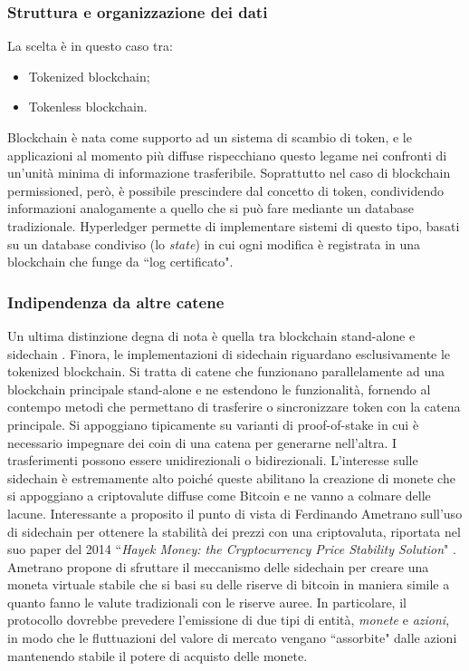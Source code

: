 		\subsubsection{Struttura e organizzazione dei dati}
			La scelta è in questo caso tra:
			\begin{itemize}
				\item Tokenized blockchain;
				\item Tokenless blockchain.
			\end{itemize}
			Blockchain è nata come supporto ad un sistema di scambio di token, e le applicazioni al momento più diffuse rispecchiano questo legame nei confronti di un'unità minima di informazione trasferibile. Soprattutto nel caso di blockchain permissioned, però, è possibile prescindere dal concetto di token, condividendo informazioni analogamente a quello che si può fare mediante un database tradizionale. Hyperledger permette di implementare sistemi di questo tipo, basati su un database condiviso (lo \emph{state}) in cui ogni modifica è registrata in una blockchain che funge da ``log certificato".
		
		\subsubsection{Indipendenza da altre catene}
			Un ultima distinzione degna di nota è quella tra blockchain stand-alone e sidechain \cite{sidechain}. Finora, le implementazioni di sidechain riguardano esclusivamente le tokenized blockchain. Si tratta di catene che funzionano parallelamente ad una blockchain principale stand-alone e ne estendono le funzionalità, fornendo al contempo metodi che permettano di trasferire o sincronizzare token con la catena principale. Si appoggiano tipicamente su varianti di proof-of-stake in cui è necessario impegnare dei coin di una catena per generarne nell'altra. I trasferimenti possono essere unidirezionali o bidirezionali. L'interesse sulle sidechain è estremamente alto poiché queste abilitano la creazione di monete che si appoggiano a criptovalute diffuse come Bitcoin e ne vanno a colmare delle lacune. Interessante a proposito il punto di vista di Ferdinando Ametrano sull'uso di sidechain per ottenere la stabilità dei prezzi con una criptovaluta, riportata nel suo paper del 2014 ``\emph{Hayek Money: the Cryptocurrency Price Stability Solution}" \cite{hayek_money}. Ametrano propone di sfruttare il meccanismo delle sidechain per creare una moneta virtuale stabile che si basi su delle riserve di bitcoin in maniera simile a quanto fanno le valute tradizionali con le riserve auree. In particolare, il protocollo dovrebbe prevedere l'emissione di due tipi di entità, \emph{monete} e \emph{azioni}, in modo che le fluttuazioni del valore di mercato vengano ``assorbite" dalle azioni mantenendo stabile il potere di acquisto delle monete.

